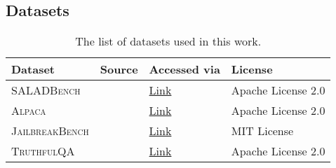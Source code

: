 \subsection{Datasets}
\begin{table}[h!]
    \centering
    \caption{The list of datasets used in this work.}
    \label{tab:datasets_used}
    \renewcommand{\arraystretch}{1.2}
    \begin{tabular}{l l l l}
        \hline
        \textbf{Dataset} & \textbf{Source} & \textbf{Accessed via} & \textbf{License} \\
        \hline
        \textsc{SALADBench} & \citet{li2024salad}  & \href{https://huggingface.co/datasets/OpenSafetyLab/Salad-Data}{Link} & Apache License 2.0 \\
        \textsc{Alpaca} & \citet{alpaca}& \href{https://huggingface.co/datasets/tatsu-lab/alpaca}{Link} & Apache License 2.0 \\
        \textsc{JailbreakBench} & \citet{chao2024jailbreakbench} & \href{https://github.com/JailbreakBench/jailbreakbench/tree/main}{Link} & MIT License \\
        \textsc{TruthfulQA} & \citet{lin2021truthfulqa} & \href{https://huggingface.co/datasets/truthfulqa/truthful_qa}{Link} & Apache License 2.0 \\
        \hline
    \end{tabular}
\end{table}












